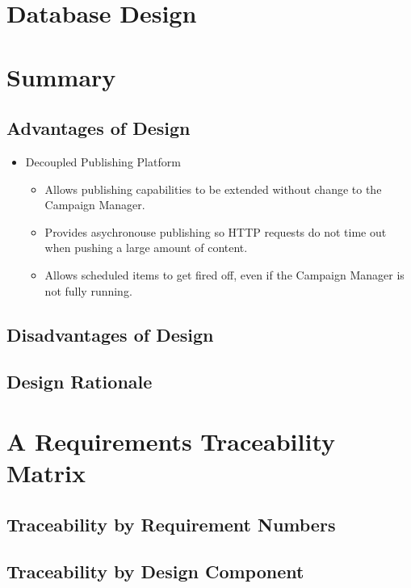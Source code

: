 \documentclass{article}
\begin{document}
\section{Database Design}
\section{Summary}
\subsection{Advantages of Design}
\begin{itemize}
\item Decoupled Publishing Platform
  \begin{itemize}
  \item Allows publishing capabilities to be extended without change to the Campaign Manager.
  \item Provides asychronouse publishing so HTTP requests do not time out when pushing a large amount of content.
  \item Allows scheduled items to get fired off, even if the Campaign Manager is not fully running.
  \end{itemize}
\end{itemize}
\subsection{Disadvantages of Design}
\subsection{Design Rationale}
\section{A Requirements Traceability Matrix}
\subsection{Traceability by Requirement Numbers}
\subsection{Traceability by Design Component}
\end{document}
